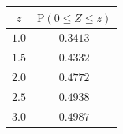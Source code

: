 {\setlength{\tabcolsep}{5pt}\renewcommand{\arraystretch}{1.25}%
\begin{tabular}{|c|c|}
\hline
$z$ & $\mathrm{P}(0\le Z\le z)$ \\
\hline
$1.0$ & $0.3413$ \\
\hline
$1.5$ & $0.4332$ \\
\hline
$2.0$ & $0.4772$ \\
\hline
$2.5$ & $0.4938$ \\
\hline
$3.0$ & $0.4987$ \\
\hline
\end{tabular}}
